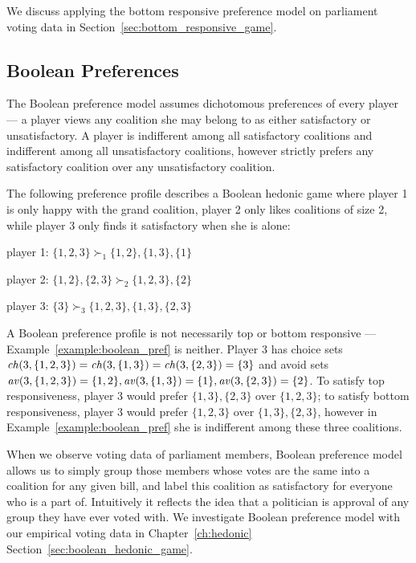 We discuss applying the bottom responsive preference model on parliament voting
data in Section~\ref{sec:bottom_responsive_game}.

\subsection{Boolean Preferences}
\label{subsec:boolean_preferences}
The Boolean preference model assumes dichotomous preferences of every player ---
a player views any coalition she may belong to as either satisfactory or
unsatisfactory.
A player is indifferent among all satisfactory coalitions and indifferent
among all unsatisfactory coalitions, however strictly prefers any satisfactory
coalition over any unsatisfactory coalition.

\begin{example}
\label{example:boolean_pref}
  The following preference profile describes a Boolean hedonic game where
  player 1 is only happy with the grand coalition, player 2 only likes coalitions
  of size 2, while player 3 only finds it satisfactory when she is alone:

  player 1: $\{1, 2, 3\} \succ_1 \{1, 2\}, \{1, 3\}, \{1\}$

  player 2: $\{1, 2\}, \{2, 3\} \succ_2 \{1, 2, 3\}, \{2\}$

  player 3: $\{3\} \succ_3 \{1, 2, 3\}, \{1, 3\}, \{2, 3\}$
\end{example}

A Boolean preference profile is not necessarily top or bottom responsive --- 
Example~\ref{example:boolean_pref} is neither.
Player 3 has choice sets
$\mathit{ch}(3, \{1, 2, 3\}) = \mathit{ch}(3, \{1, 3\}) = \mathit{ch}(3, \{2, 3\}) = \{3\}$ and avoid sets 
$\mathit{av}(3, \{1, 2, 3\}) = \{1, 2\}, \mathit{av}(3, \{1, 3\}) = \{1\},
\mathit{av}(3, \{2, 3\}) = \{2\}$.
To satisfy top responsiveness, player 3 would prefer $\{1, 3\}, \{2, 3\}$ over
$\{1, 2, 3\}$; to satisfy bottom responsiveness, player 3 would prefer
$\{1, 2, 3\}$ over $\{1, 3\}, \{2, 3\}$, however in Example~\ref{example:boolean_pref} she is indifferent among these three coalitions.

When we observe voting data of parliament members, Boolean preference model
allows us to simply group those members whose votes are the same into a coalition
for any given bill, and label this coalition as satisfactory for everyone who is
a part of.
Intuitively it reflects the idea that a politician is approval of any group they
have ever voted with.
We investigate Boolean preference model with our empirical voting data in
Chapter~\ref{ch:hedonic} Section~\ref{sec:boolean_hedonic_game}.


